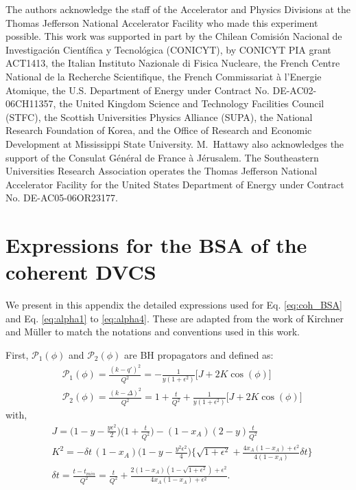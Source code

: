 \documentclass[aps,prc,preprint,superscriptaddress]{revtex4}
\begin{document}
\begin{acknowledgments}
 The authors acknowledge the staff of the Accelerator and Physics Divisions at 
the Thomas Jefferson National Accelerator Facility who made this experiment 
possible. This work was supported in part by the Chilean Comisi\'on Nacional de 
Investigaci\'on Cient\'ifica y Tecnol\'ogica (CONICYT), by CONICYT PIA grant 
ACT1413, the Italian Instituto Nazionale di Fisica Nucleare, the French Centre 
National de la Recherche Scientifique, the French Commissariat \`a l'Energie 
Atomique, the U.S. Department of Energy under Contract No. DE-AC02-06CH11357, 
the United Kingdom Science and Technology Facilities Council (STFC), the 
Scottish Universities Physics Alliance (SUPA), the National Research Foundation 
of Korea, and the Office of Research and Economic Development at Mississippi 
State University.  M.~Hattawy also acknowledges the support of the Consulat 
G\'en\'eral de France \`a J\'erusalem.  The Southeastern Universities Research 
Association operates the Thomas Jefferson National Accelerator Facility for the 
United States Department of Energy under Contract No. DE-AC05-06OR23177.
\end{acknowledgments}

\appendix
\section{Expressions for the BSA of the coherent DVCS}
\label{sec:eq}

We present in this appendix the detailed expressions used for Eq. \ref{eq:coh_BSA} 
and Eq. \ref{eq:alpha1} to \ref{eq:alpha4}. These are adapted from the work of 
Kirchner and Müller \cite{Kirchner:2003wt} to match the notations and conventions used
in this work.
	
First, $\mathcal{P}_{1}(\phi)$ and $\mathcal{P}_{2}(\phi)$ are BH propagators and defined as:
\begin{align}
&\mathcal{P}_{1}(\phi) = \frac{(k - q')^{2}}{Q^{2}} = - \frac{1}{y (1 + \epsilon^{2})} 
\big[ J + 2 K \cos(\phi) \big] \\
&\mathcal{P}_{2}(\phi) = \frac{(k - \Delta)^{2}}{Q^{2}} = 1 + \frac{t}{Q^{2}} + 
\frac{1}{y (1 + \epsilon^{2})} \big[ J + 2 K \cos(\phi) \big]
\end{align}
with,
\begin{align}
& J = \bigg( 1 - y - \frac{y \epsilon^{2}}{2} \bigg) \bigg(1 + \frac{t}{Q^{2}} \bigg) - 
(1 - x_{A})(2 - y) \frac{t}{Q^{2}} \\
& K^{2} = - \delta t \, (1 - x_{A}) \bigg( 1 - y - \frac{y^{2} \epsilon^{2}}{4} \bigg) 
\bigg\{ \sqrt{1 + \epsilon^{2}} + \frac{4 x_{A} (1-x_{A}) + \epsilon^{2}}{4 (1 - x_{A})}
\delta t \bigg\} \\
& \delta t = \frac{t - t_{min}}{Q^{2}} = \frac{t}{Q^{2}} + \frac{2(1-x_{A}) \left(1- \sqrt{1 + 
\epsilon^{2}} \right) + \epsilon^{2}}{4 x_{A} (1- x_{A}) + \epsilon^{2}}.
\end{align}
\end{document}
